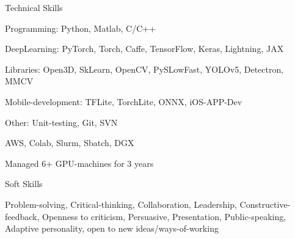 \documentclass{resume} %
\begin{document}
\begin{paracol}{2}
\begin{rSection}{Technical Skills}{} 
\begin{sSubsection}{{Programming}: Python, Matlab, C/C++}\end{sSubsection}
\begin{sSubsection}{{DeepLearning}: PyTorch, Torch, Caffe, TensorFlow, Keras, Lightning, JAX}\end{sSubsection}
\begin{sSubsection}{{Libraries}: Open3D, SkLearn, OpenCV, PySLowFast, YOLOv5, Detectron, MMCV}\end{sSubsection}
\begin{sSubsection}{{Mobile-development}: TFLite, TorchLite, ONNX, iOS-APP-Dev}\end{sSubsection}
\begin{sSubsection}{{Other}: Unit-testing, Git, SVN}\end{sSubsection} %
\begin{sSubsection}{AWS, Colab, Slurm, Sbatch, DGX}\end{sSubsection}
\begin{sSubsection}{Managed 6+ GPU-machines for 3 years}\end{sSubsection}
\end{rSection}

\begin{rSection}{Soft Skills}{} 
  \begin{sSubsection}{Problem-solving, Critical-thinking, Collaboration, Leadership, 
  Constructive-feedback, Openness to criticism, Persuasive, Presentation, Public-speaking, Adaptive personality, open to new ideas/ways-of-working}\end{sSubsection}
    

\end{rSection}
\end{paracol}
\end{document}
